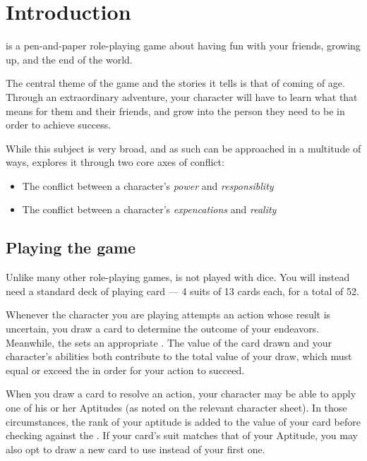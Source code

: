 \chapter{Introduction}

\ParadoxSpaceRPG{} is a pen-and-paper role-playing game about having fun with your friends, growing up,
and the end of the world.

The central theme of the game and the stories it tells is that of coming of age. Through an extraordinary
adventure, your character will have to learn what that means for them and their friends, and grow into the
person they need to be in order to achieve success.

While this subject is very broad, and as such can be approached in a multitude of ways, \ParadoxSpaceRPG{}
explores it through two core axes of conflict:
\begin{itemize}
	\item The conflict between a character's \emph{power} and \emph{responsiblity}
	\item The conflict between a character's \emph{expencations} and \emph{reality}
\end{itemize}


\section{Playing the game}

Unlike many other role-playing games, \ParadoxSpaceRPG{} is not played with dice.
You will instead need a standard deck of playing card --- 4 suits of 13 cards each, for a total of 52.

Whenever the character you are playing attempts an action whose result is uncertain, you draw a card to
determine the outcome of your endeavors. Meanwhile, the \GM sets an appropriate \TN.
The value of the card drawn and your character's abilities both contribute to the total value of your
draw, which must equal or exceed the \TN in order for your action to succeed.

When you draw a card to resolve an action, your character may be able to apply one of his or her Aptitudes
(as noted on the relevant character sheet). In those circumstances, the rank of your aptitude is added
to the value of your card before checking against the \TN. If your card's suit matches that of your Aptitude,
you may also opt to draw a new card to use instead of your first one.

